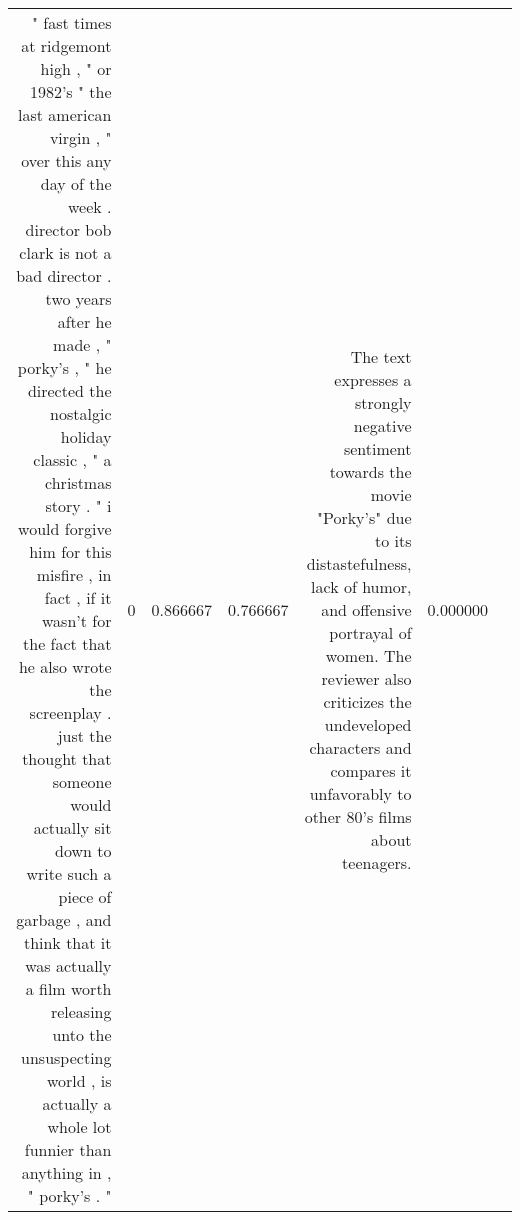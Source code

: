 \begin{tabular}{rlrrrlr}
" fast times at ridgemont high , " or 1982's " the last american virgin , " over this any day of the week .  director bob clark is not a bad director .  two years after he made , " porky's , " he directed the nostalgic holiday classic , " a christmas story . "  i would forgive him for this misfire , in fact , if it wasn't for the fact that he also wrote the screenplay .  just the thought that someone would actually sit down to write such a piece of garbage , and think that it was actually a film worth releasing unto the unsuspecting world , is actually a whole lot funnier than anything in , " porky's . "   & 0 & 0.866667 & 0.766667 & The text expresses a strongly negative sentiment towards the movie "Porky's" due to its distastefulness, lack of humor, and offensive portrayal of women. The reviewer also criticizes the undeveloped characters and compares it unfavorably to other 80's films about teenagers. & 0.000000 \\

\end{tabular}
